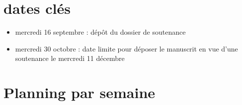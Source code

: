 \documentclass[11pt]{article}
\date{}
\title{}
\begin{document}
\tableofcontents

\section{dates clés}
\label{sec:org4126010}

\begin{itemize}
\item mercredi 16 septembre : dépôt du dossier de soutenance
\item mercredi 30 octobre : date limite pour déposer le manuscrit en vue d'une
soutenance le mercredi 11 décembre
\end{itemize}
\section{Planning par semaine}
\label{sec:org02d0db6}
\end{document}
